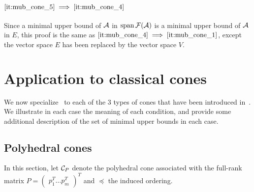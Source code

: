 \documentclass[main]{subfiles}
\begin{document}
\paragraph{$ \eqref{it:mub_cone_5} \implies \eqref{it:mub_cone_4}$}
Since a minimal upper bound of $\mathcal{A}$ in $\operatorname{span} \mathcal{F}(\mathcal{A})$ is a minimal upper bound of $\mathcal{A}$ in $E$, this proof is the same as $\eqref{it:mub_cone_4} \implies \eqref{it:mub_cone_1}$, except the vector space $E$ has been replaced by the vector space $V$. 


\section{Application to classical cones}
\label{sec:mub_cone_coro}

We now specialize~ to each of the $3$ types of cones that have been introduced in~. We illustrate in each case the meaning of each condition, and provide some additional description of the set of minimal upper bounds in each case.

%
%
%
%

\subsection{Polyhedral cones}
\label{sec:appli_poly}

In this section, let $\mathcal{C}_P$ denote the polyhedral cone associated with the full-rank matrix $P = \begin{pmatrix}
p_1^T \dots p_m^T
\end{pmatrix}^T$
and $\preceq$ the induced ordering.
\end{document}
